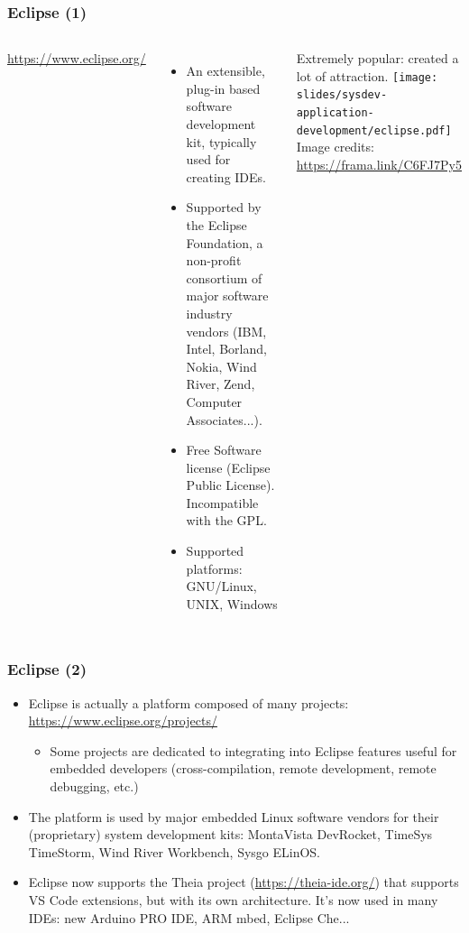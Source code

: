 \begin{frame}
  \frametitle{Eclipse (1)}
  \begin{columns}[T]
    \url{https://www.eclipse.org/}
    \begin{itemize}
    \item An extensible, plug-in based software development kit,
      typically used for creating IDEs.
    \item Supported by the Eclipse Foundation, a non-profit consortium
      of major software industry vendors (IBM, Intel, Borland, Nokia,
      Wind River, Zend, Computer Associates...).
    \item Free Software license (Eclipse Public License). Incompatible
      with the GPL.
    \item Supported platforms: GNU/Linux, UNIX, Windows
    \end{itemize}
    Extremely popular: created a lot of attraction.
    \texttt{[image: slides/sysdev-application-development/eclipse.pdf]}
    \vspace{1cm}\\
    \tiny Image credits:\\
    \url{https://frama.link/C6FJ7Py5}
  \end{columns}
\end{frame}

\begin{frame}
  \frametitle{Eclipse (2)}
  \begin{itemize}
  \item Eclipse is actually a platform composed of many projects:\\
    \url{https://www.eclipse.org/projects/}
    \begin{itemize}
    \item Some projects are dedicated to integrating into Eclipse
      features useful for embedded developers (cross-compilation,
      remote development, remote debugging, etc.)
    \end{itemize}
  \item The platform is used by major embedded Linux software vendors
    for their (proprietary) system development kits: MontaVista
    DevRocket, TimeSys TimeStorm, Wind River Workbench, Sysgo ELinOS.
  \item Eclipse now supports the Theia project
    (\url{https://theia-ide.org/}) that supports VS Code extensions,
    but with its own architecture. It's now used in many IDEs:
    new Arduino PRO IDE, ARM mbed, Eclipse Che...
  \end{itemize}
\end{frame}

